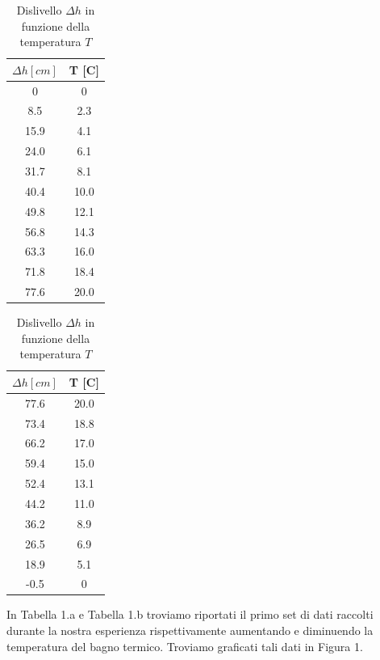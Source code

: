 \begin{table}[H]
\centering
	\begin{subtable}{.5\textwidth}
		\centering
		\begin{tabular}{|c|c|} \hline
			\textbf{$\Delta h {[cm]}$ } & \textbf{T {[\degree C]} }  \\ \hline
			0 & 0  \\ \hline
			8.5 & 2.3  \\ \hline
			15.9 & 4.1  \\ \hline
			24.0 & 6.1  \\ \hline
			31.7 & 8.1  \\ \hline
			40.4 & 10.0 \\ \hline
			49.8 & 12.1  \\ \hline
			56.8 & 14.3  \\ \hline
			63.3 & 16.0  \\ \hline
			71.8 & 18.4  \\ \hline
			77.6 & 20.0  \\ \hline
		\end{tabular}
		\caption{Aumento della temperatura }
	\end{subtable}%
	\begin{subtable}{.5\textwidth}
	\centering
	\begin{tabular}{|c|c|} \hline
		\textbf{$\Delta h {[cm]}$ } & \textbf{T {[\degree C]} }  \\ \hline
		77.6 & 20.0  \\ \hline
		73.4 & 18.8  \\ \hline
		66.2 & 17.0  \\ \hline
		59.4 & 15.0  \\ \hline
		52.4 & 13.1  \\ \hline
		44.2 & 11.0  \\ \hline
		36.2 & 8.9  \\ \hline
		26.5 & 6.9  \\ \hline
		18.9 & 5.1  \\ \hline
		-0.5 & 0  \\ \hline
	\end{tabular}
	\caption{Diminuzione della temperatura }
\end{subtable}

\caption{Dislivello $\Delta h$ in funzione della temperatura $T$ }
\end{table}
In Tabella 1.a e Tabella 1.b troviamo riportati il primo set di dati raccolti durante la nostra esperienza rispettivamente aumentando e diminuendo la temperatura del bagno termico.
Troviamo graficati tali dati in Figura 1. 

